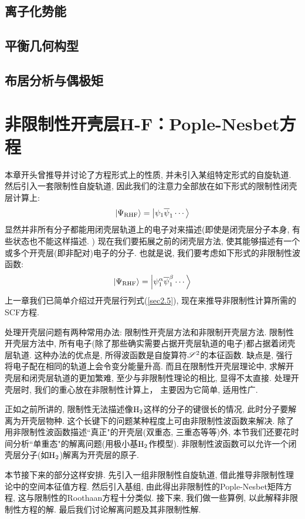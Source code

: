 \subsection{离子化势能}
\subsection{平衡几何构型}
\subsection{布居分析与偶极矩}

\section{非限制性开壳层H-F：Pople-Nesbet方程}
本章开头曾推导并讨论了\hft 方程形式上的性质, 
并未引入某组特定形式的自旋轨道. 
然后引入一套限制性自旋轨道, 
因此我们的注意力全部放在如下形式的限制性闭壳层计算上:
\begin{align}
	\Ket{\Psi_\mathrm{RHF}} = \Ket{\psi_1\overline{\psi}_1\cdots}
\end{align}
显然并非所有分子都能用闭壳层轨道上的电子对来描述(即使是闭壳层分子本身, 
有些状态也不能这样描述.
) 现在我们要拓展之前的闭壳层方法, 
使其能够描述有一个或多个开壳层(即非配对)电子的分子. 
也就是说, 
我们要考虑如下形式的非限制性波函数:
\begin{align}
	\Ket{\Psi_\mathrm{RHF}} = \Ket{\psi_1^\alpha\overline{\psi}_1^\beta\cdots}
\end{align}
上一章我们已简单介绍过开壳层行列式(\ref{sec2.5}), 
现在来推导非限制性计算所需的SCF方程.


处理开壳层问题有两种常用办法: 限制性开壳层\hft 方法和非限制开壳层\hft 方法. 
限制性开壳层方法中, 
所有电子(除了那些确实需要占据开壳层轨道的电子)都占据着闭壳层轨道. 
这种办法的优点是, 
所得波函数是自旋算符$\mathscr{S}^2$的本征函数. 
缺点是, 
强行将电子配在相同的轨道上会令变分能量升高. 
而且在限制性开壳层\hft 理论中, 
求解开壳层和闭壳层轨道的更加繁难, 
至少与非限制性\hft 理论的相比, 
显得不太直接. 
处理开壳层时, 
我们的重心放在非限制性计算上， 
主要因为它简单, 
适用性广.


正如之前所讲的, 
限制性\hft  无法描述像$\mathrm{H}_2$这样的分子的键很长的情况, 
此时分子要解离为开壳层物种. 
这个长键下的问题某种程度上可由非限制性波函数来解决. 
除了用非限制性波函数描述``真正"的开壳层(双重态, 
三重态等等)外, 
本节我们还要花时间分析``单重态"的解离问题(用极小基$\mathrm{H}_2$作模型). 
非限制性波函数可以允许一个闭壳层分子(如$\mathrm{H}_2$)解离为开壳层的原子.


本节接下来的部分这样安排. 
先引入一组非限制性自旋轨道, 
借此推导非限制性\hft 理论中的空间本征值方程. 
然后引入基组, 
由此得出非限制性的Pople-Nesbet矩阵方程, 
这与限制性的Roothaan方程十分类似. 
接下来, 
我们做一些算例, 
以此解释非限制性方程的解. 
最后我们讨论解离问题及其非限制性解.

